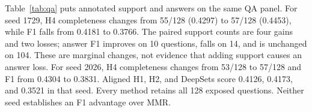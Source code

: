 Table~\ref{tab:qa} puts annotated support and answers on the same QA panel.
For seed 1729, H4 completeness changes from 55/128 (0.4297) to 57/128
(0.4453), while F1 falls from 0.4181 to 0.3766. The paired support counts
are four gains and two losses; answer F1 improves on 10 questions, falls on
14, and is unchanged on 104. These are marginal changes, not evidence that
adding support causes an answer loss. For seed 2026, H4 completeness changes
from 53/128 to 57/128 and F1 from 0.4304 to 0.3831. Aligned H1, H2, and
DeepSets score 0.4126, 0.4173, and 0.3521 in that seed. Every method retains
all 128 exposed questions. Neither seed establishes an F1 advantage over MMR.
